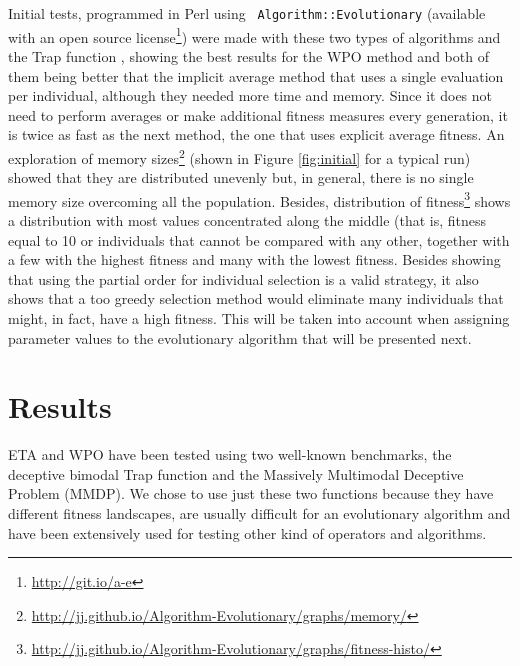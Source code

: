 \documentclass{llncs}
\begin{document}
\sloppypar Initial tests, programmed in Perl using {\tt
  Algorithm::Evolutionary} \cite{ae09} (available with an open %
source license\footnote{\url{http://git.io/a-e}}) were made with these two types of algorithms and the
Trap function \cite{wilcoxon:ga}, showing the best results for the WPO
method and both of them being better that
the implicit average method that uses a single evaluation per
individual, although they needed more time and memory. Since it does not need to perform averages or make
additional fitness measures every generation, it is twice as fast as
the next method, the one that uses explicit average fitness. An
exploration of memory sizes\footnote{\url{http://jj.github.io/Algorithm-Evolutionary/graphs/memory/} } %
(shown in Figure \ref{fig:initial} for a
typical run) showed that they are distributed unevenly but, in general, there is no single memory size
overcoming all the population. Besides, distribution of fitness\footnote{\url{http://jj.github.io/Algorithm-Evolutionary/graphs/fitness-histo/}} shows a
distribution with most values concentrated along the middle (that is,
fitness equal to 10 or individuals that cannot be compared with any
other,
 together with a few with the highest fitness and many with the
lowest fitness. Besides showing that using the partial order for individual selection 
is a valid strategy, it also shows that a too greedy selection method would
eliminate many individuals that might, in fact, have a high fitness. This
will be taken into account when assigning parameter values to the
evolutionary algorithm that will be presented next.



\section{Results}
\label{sec:res}

ETA and WPO have been tested using two well-known benchmarks, the deceptive bimodal Trap \cite{deb1992analyzing}
function and the Massively Multimodal Deceptive Problem \cite{goldberg92massive} (MMDP). 
We chose to use just these two functions 
because they have different fitness landscapes, are usually difficult
for an evolutionary algorithm and have been extensively used for
testing other kind of operators and algorithms.
\end{document}
